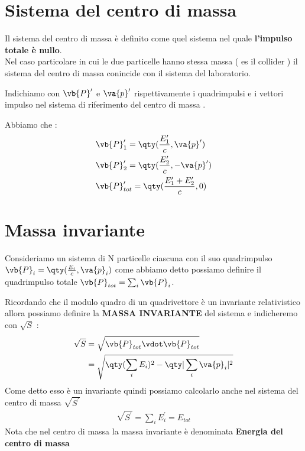 \documentclass[a4paper, 12pt, twoside]{report}
\begin{document}
\section{Sistema del centro di massa}
Il sistema del centro di massa è definito come quel sistema nel quale \textbf{l'impulso totale è nullo}.\\
Nel caso particolare in cui le due particelle hanno stessa massa ( es il collider ) il sistema del centro di massa conincide con il sistema del laboratorio. \\
\begin{tcolorbox}[colback=red!5!white,colframe=red!50!black,title=ATTENZIONE !]
        Indichiamo con $\vb{P}^{\prime}$ e $\va{p}^{\prime}$ rispettivamente i quadrimpulsi e i vettori impulso nel sistema di riferimento del centro di massa .
\end{tcolorbox}
\newpage
Abbiamo che : 
\begin{align*}
    &\vb{P}^{\prime}_1 = \qty(\frac{E^{\prime}_1}{c}, \va{p}^{\prime}) \\
    &\vb{P}^{\prime}_2 = \qty(\frac{E^{\prime}_2}{c}, -\va{p}^{\prime}) \\
    &\vb{P}^{\prime}_{tot} = \qty(\frac{E^{\prime}_1 +  E^{\prime}_2}{c}, 0) \end{align*}
\section{Massa invariante}
Consideriamo un sistema di N particelle ciascuna con il suo quadrimpulso $\vb{P}_{i} = \qty(\frac{E_{i}}{c},\va{p}_{i})$ come abbiamo detto 
possiamo definire il quadrimpulso totale $\vb{P}_{tot} = \sum_i \vb{P}_{i}$. \\
\begin{tcolorbox}[colback=red!5!white,colframe=red!50!black,title=ATTENZIONE !]
Ricordando che il modulo quadro di un quadrivettore è un invariante relativistico allora possiamo definire la \textbf{MASSA INVARIANTE} del sistema 
e indicheremo con $\sqrt{S}$ : 
\begin{align*}
    \sqrt{S} &= \sqrt{\vb{P}_{tot} \vdot \vb{P}_{tot}} \\
             &= \sqrt{\qty(\sum_i E_{i})^2 - \qty|\sum_i \va{p}_{i}|^2 }
\end{align*}
Come detto esso è un invariante quindi possiamo calcolarlo anche nel sistema del centro di massa $\sqrt{S^{\prime}}$
\begin{align*}
        \sqrt{S^{\prime}} = \sum_i E^{\prime}_{i} = E_{tot}
\end{align*}
Nota che nel centro di massa la massa invariante è denominata \textbf{Energia del centro di massa}
\end{tcolorbox}
\newpage
\end{document}
